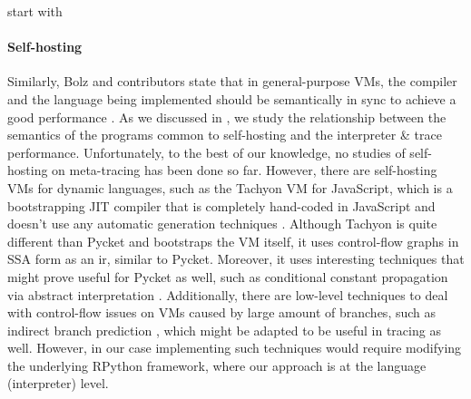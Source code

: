         \begin{paragraph-here}%
            start with \paragraph{Self-hosting}

            Similarly, Bolz and contributors state that in general-purpose VMs,
            the compiler and the language being implemented should be semantically
            in sync to achieve a good performance \cite{bolzHowNotWrite,
            runtime-feedback:11}. As we discussed in
            , we study the relationship between the
            semantics of the programs common to self-hosting and the interpreter
            \& trace performance. Unfortunately, to the best of our knowledge, no
            studies of self-hosting on meta-tracing has been done so far. However,
            there are self-hosting VMs for dynamic languages, such as the Tachyon
            VM for JavaScript, which is a bootstrapping JIT compiler that is
            completely hand-coded in JavaScript and doesn't use any automatic
            generation techniques \cite{self-hosted-tachyon}. Although Tachyon is
            quite different than Pycket and bootstraps the VM itself, it uses
            control-flow graphs in SSA form as an \gls{ir}, similar to Pycket. Moreover, it uses interesting techniques that
            might prove useful for Pycket as well, such as conditional constant
            propagation via abstract interpretation \cite{sccp:91}. Additionally,
            there are low-level techniques to deal with control-flow issues on VMs
            caused by large amount of branches, such as indirect branch prediction
            \cite{branch-predict:03}, which might be adapted to be useful in
            tracing as well. However, in our case implementing such techniques
            would require modifying the underlying RPython framework, where our
            approach is at the language (interpreter) level.
        \end{paragraph-here}

